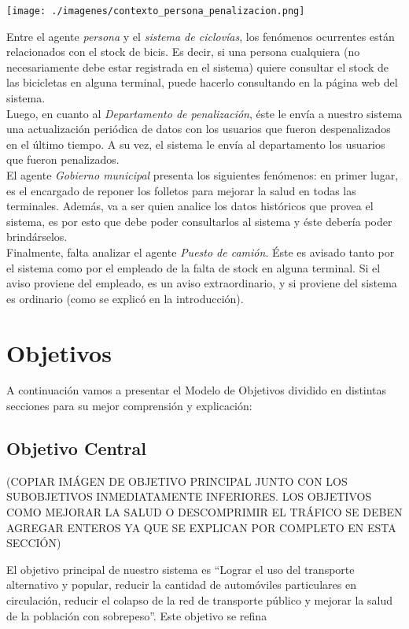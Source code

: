 \documentclass[a4paper, 11pt, spanish]{article}
\begin{document}
\centerline{\texttt{[image: ./imagenes/contexto\_persona\_penalizacion.png]}}

Entre el agente \textit{persona} y el \textit{sistema de ciclovías}, los fenómenos ocurrentes están relacionados con el stock de bicis. Es decir, si una persona cualquiera (no necesariamente debe estar registrada en el sistema) quiere consultar el stock de las bicicletas en alguna terminal, puede hacerlo consultando en la página web del sistema.\\

Luego, en cuanto al \textit{Departamento de penalización}, éste le envía a nuestro sistema una actualización periódica de datos con los usuarios que fueron despenalizados en el último tiempo. A su vez, el sistema le envía al departamento los usuarios que fueron penalizados.\\

El agente \textit{Gobierno municipal} presenta los siguientes fenómenos: en primer lugar, es el encargado de reponer los folletos para mejorar la salud en todas las terminales. Además, va a ser quien analice los datos históricos que provea el sistema, es por esto que debe poder consultarlos al sistema y éste debería poder brindárselos.\\

Finalmente, falta analizar el agente \textit{Puesto de camión}. Éste es avisado tanto por el sistema como por el empleado de la falta de stock en alguna terminal. Si el aviso proviene del empleado, es un aviso extraordinario, y si proviene del sistema es ordinario (como se explicó en la introducción).\\

 \newpage
\section{Objetivos}
A continuación vamos a presentar el Modelo de Objetivos dividido en distintas secciones para su mejor comprensión y explicación:

\subsection{Objetivo Central}
(COPIAR IMÁGEN DE OBJETIVO PRINCIPAL JUNTO CON LOS SUBOBJETIVOS INMEDIATAMENTE INFERIORES. LOS OBJETIVOS COMO MEJORAR LA SALUD O DESCOMPRIMIR EL TRÁFICO SE DEBEN AGREGAR ENTEROS YA QUE SE EXPLICAN POR COMPLETO EN ESTA SECCIÓN)

El objetivo principal de nuestro sistema es “Lograr el uso del transporte alternativo y popular, reducir la cantidad de automóviles particulares en circulación, reducir el colapso de la red de transporte público y mejorar la salud de la población con sobrepeso”. Este objetivo se refina 
\end{document}
